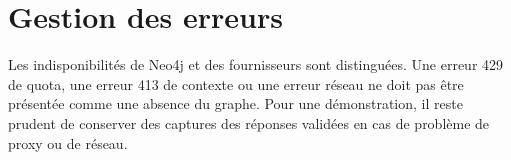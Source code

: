 
\section{Gestion des erreurs}

Les indisponibilités de Neo4j et des fournisseurs sont distinguées. Une erreur 429 de quota, une erreur 413 de contexte ou une erreur réseau ne doit pas être présentée comme une absence du graphe. Pour une démonstration, il reste prudent de conserver des captures des réponses validées en cas de problème de proxy ou de réseau.
